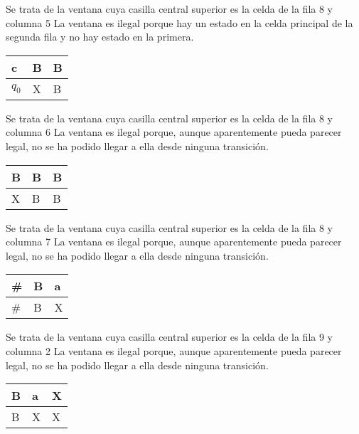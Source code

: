 ﻿\documentclass[a4paper,10pt]{article}
\begin{document}
Se trata de la ventana cuya casilla central superior es la celda de la fila 8 y columna 5\newline
La ventana es ilegal porque hay un estado en la celda principal de la segunda fila y no hay estado en la primera.\newline
\begin{table}[h!]
\centering
\begin{tabular}{|l|l|l|}
\hline
	c   &   B   &   B	\\ \hline
	$q_0$  &   X   &   B	\\ \hline
\end{tabular}
\end{table}

Se trata de la ventana cuya casilla central superior es la celda de la fila 8 y columna 6\newline
La ventana es ilegal porque, aunque aparentemente pueda parecer legal, no se ha podido llegar a ella desde ninguna transición.\newline
\begin{table}[h!]
\centering
\begin{tabular}{|l|l|l|}
\hline
	B   &   B   &   B	\\ \hline
	X   &   B   &   B	\\ \hline
\end{tabular}
\end{table}

Se trata de la ventana cuya casilla central superior es la celda de la fila 8 y columna 7\newline
La ventana es ilegal porque, aunque aparentemente pueda parecer legal, no se ha podido llegar a ella desde ninguna transición.\newline
\begin{table}[h!]
\centering
\begin{tabular}{|l|l|l|}
\hline
	\#  &   B   &   a	\\ \hline
	\#  &   B   &   X	\\ \hline
\end{tabular}
\end{table}

Se trata de la ventana cuya casilla central superior es la celda de la fila 9 y columna 2\newline
La ventana es ilegal porque, aunque aparentemente pueda parecer legal, no se ha podido llegar a ella desde ninguna transición.\newline
\begin{table}[h!]
\centering
\begin{tabular}{|l|l|l|}
\hline
	B   &   a   &   X	\\ \hline
	B   &   X   &   X	\\ \hline
\end{tabular}
\end{table}
\end{document}
